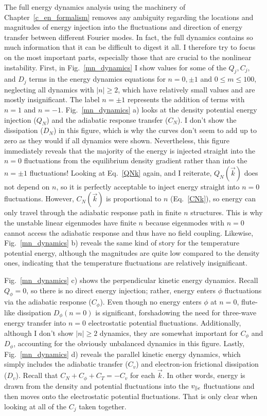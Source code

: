 The full energy dynamics analysis using the machinery of Chapter~\ref{c_en_formalism} removes any ambiguity regarding the locations and magnitudes of energy injection into the fluctuations
and direction of energy transfer between different Fourier modes. In fact, the full dynamics contains so much information that it can be difficult to digest it all. I therefore try to
focus on the most important parts, especially those that are crucial to the nonlinear instability. First, in Fig.~\ref{mn_dynamics} I show values for some of the $Q_j, C_j,$ and $D_j$
terms in the energy dynamics equations for $n=0, \pm 1$ and $0 \le m \le 100$,
neglecting all dynamics with $|n| \ge 2$, which have relatively small values and are mostly insignificant. The label $n = \pm 1$ represents the addition of terms with $n=1$ and $n=-1$.
Fig.~\ref{mn_dynamics} a) looks at the density potential energy injection ($Q_N$) and the adiabatic response transfer ($C_N$). I don't show the dissipation ($D_N$) in this figure, which
is why the curves don't seem to add up to zero as they would if all dynamics were shown.
Nevertheless, this figure immediately reveals that the majority of the energy is injected
straight into the $n=0$ fluctuations from the equilibrium density gradient rather than into the $n= \pm 1$ fluctuations! Looking at Eq.~\ref{QNk} again, and I reiterate, $Q_N(\vec{k})$ does not
depend on $n$, so it is perfectly acceptable to inject energy straight into $n=0$ fluctuations. However, $C_N(\vec{k})$ is proportional to $n$ (Eq.~\ref{CNk}), so energy can only travel
through the adiabatic response path in finite $n$ structures. This is why the unstable linear eigenmodes have finite $n$ because eigenmodes with $n=0$ cannot access the adiabatic response and thus
have no field coupling. Likewise, Fig.~\ref{mn_dynamics} b) reveals the same kind of story for the temperature potential energy, although the magnitudes are quite low compared to the density ones,
indicating that the temperature fluctuations are relatively insignificant.

Fig.~\ref{mn_dynamics} c) shows the perpendicular kinetic energy dynamics. Recall $Q_\phi = 0$, so there is no direct energy injection; rather, energy enters $\phi$ fluctuations via the adiabatic
response ($C_\phi$). Even though no energy enters $\phi$ at $n=0$, flute-like dissipation $D_\phi(n=0)$ is significant, forshadowing the need for three-wave energy transfer into $n=0$ electrostatic 
potential fluctuations. Additionally, although I don't show $|n| \ge 2$ dynamics, they are somewhat important for $C_\phi$ and $D_\phi$, accounting for the obviously unbalanced dynamics in this figure.
Lastly, Fig.~\ref{mn_dynamics} d) reveals the parallel kinetic energy dynamics, which simply includes the adiabatic transfer ($C_v$) and electron-ion frictional dissipation ($D_v$). Recall that
$C_N + C_\phi + C_T = - C_v$ for each $\vec{k}$. In other words, energy is drawn from the density and potential fluctuations into the $v_{\parallel e}$ fluctuations and then moves onto the electrostatic potential
fluctuations. That is only clear when looking at all of the $C_j$ taken together.

